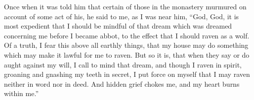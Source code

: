 \documentclass{book}
\begin{document}
\begin{paracol}{2}
\begin{otherlanguage}{latin}
\end{otherlanguage}

\switchcolumn

Once when it was told him that certain of those in the monastery murmured on account of some act of his, he said to me, as I was near him, ``God, God, it is most expedient that I should be mindful of that dream which was dreamed concerning me before I became abbot, to the effect that I should raven as a wolf. Of a truth, I fear this above all earthly things, that my house may do something which may make it lawful for me to raven. But so it is, that when they say or do aught against my will, I call to mind that dream, and though I raven in spirit, groaning and gnashing my teeth in secret, I put force on myself that I may raven neither in word nor in deed. And hidden grief chokes me, and my heart burns within me.''


























\end{paracol}
\end{document}
